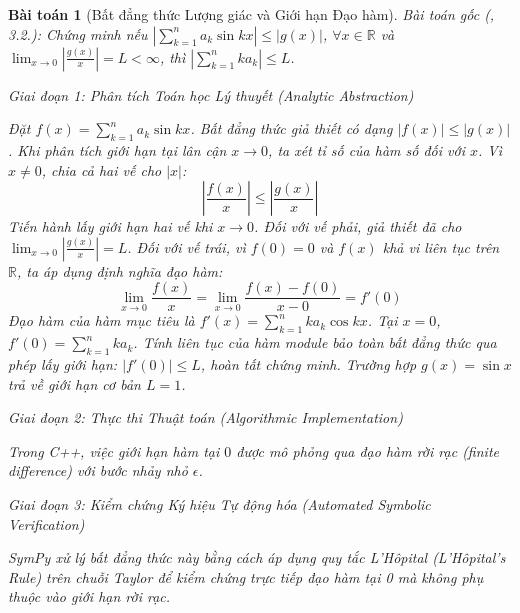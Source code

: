 \documentclass{article}
\newtheorem{baitoan}{Bài toán}
\begin{document}
\begin{baitoan}[Bất đẳng thức Lượng giác và Giới hạn Đạo hàm]
 \emph{Bài toán gốc (\cite{Quoc_Long_Dat_Nam_VMC}, 3.2.):} 
 Chứng minh nếu $|\sum_{k=1}^n a_k\sin kx|\le|g(x)|$, $\forall x\in\mathbb{R}$ và $\lim_{x\to0} \left|\frac{g(x)}{x}\right| = L < \infty$, thì $|\sum_{k=1}^n k a_k|\le L$.

\vspace{0.5em}\noindent\emph{Giai đoạn 1: Phân tích Toán học Lý thuyết (Analytic Abstraction)}
 
 Đặt $f(x) = \sum_{k=1}^n a_k\sin kx$. Bất đẳng thức giả thiết có dạng $|f(x)| \le |g(x)|$. Khi phân tích giới hạn tại lân cận $x \to 0$, ta xét tỉ số của hàm số đối với $x$. Vì $x \neq 0$, chia cả hai vế cho $|x|$:
 \begin{equation}
 \left| \frac{f(x)}{x} \right| \le \left| \frac{g(x)}{x} \right|
 \end{equation}
 Tiến hành lấy giới hạn hai vế khi $x \to 0$. Đối với vế phải, giả thiết đã cho $\lim_{x\to0} \left|\frac{g(x)}{x}\right| = L$. Đối với vế trái, vì $f(0) = 0$ và $f(x)$ khả vi liên tục trên $\mathbb{R}$, ta áp dụng định nghĩa đạo hàm:
 \begin{equation}
 \lim_{x\to0} \frac{f(x)}{x} = \lim_{x\to0} \frac{f(x) - f(0)}{x - 0} = f'(0)
 \end{equation}
 Đạo hàm của hàm mục tiêu là $f'(x) = \sum_{k=1}^n k a_k \cos kx$. Tại $x=0$, $f'(0) = \sum_{k=1}^n k a_k$. 
 Tính liên tục của hàm module bảo toàn bất đẳng thức qua phép lấy giới hạn: $|f'(0)| \le L$, hoàn tất chứng minh. Trường hợp $g(x) = \sin x$ trả về giới hạn cơ bản $L = 1$.

\vspace{0.5em}\noindent\emph{Giai đoạn 2: Thực thi Thuật toán (Algorithmic Implementation)}
 
 Trong C++, việc giới hạn hàm tại $0$ được mô phỏng qua đạo hàm rời rạc (finite difference) với bước nhảy nhỏ $\epsilon$.



\vspace{0.5em}\noindent\emph{Giai đoạn 3: Kiểm chứng Ký hiệu Tự động hóa (Automated Symbolic Verification)}
 
 \textsf{SymPy} xử lý bất đẳng thức này bằng cách áp dụng quy tắc L'Hôpital (L'Hôpital's Rule) trên chuỗi Taylor để kiểm chứng trực tiếp đạo hàm tại 0 mà không phụ thuộc vào giới hạn rời rạc.




\end{baitoan}
\end{document}
